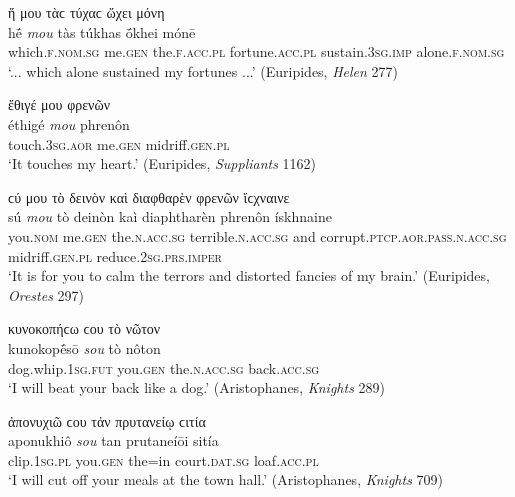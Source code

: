 \begin{exe}
\ex ἥ μου τὰϲ τύχαϲ ὤχει μόνη\\
\gll hḗ \emph{mou} tàs túkhas ṓkhei mónē\\
which.\textsc{f.nom.sg} me.\textsc{gen} the.\textsc{f.acc.pl} fortune.\textsc{acc.pl} sustain.\textsc{3sg.imp} alone.\textsc{f.nom.sg}\\
\trans `... which alone sustained my fortunes ...' (Euripides, \textit{Helen} 277)
\label{gen6}
\end{exe}

\begin{exe}
\ex ἔθιγέ μου φρενῶν\\
\gll éthigé \emph{mou} phrenôn\\
touch.\textsc{3sg.aor} me.\textsc{gen} midriff.\textsc{gen.pl}\\
\trans `It touches my heart.' (Euripides, \textit{Suppliants} 1162)
\label{gen7}
\end{exe}

\begin{exe}
\ex ϲύ μου τὸ δεινὸν καὶ διαφθαρὲν φρενῶν ἴϲχναινε\\
\gll sú \emph{mou} tò deinòn kaì diaphtharèn phrenôn ískhnaine\\
you.\textsc{nom} me.\textsc{gen} the.\textsc{n.acc.sg} terrible.\textsc{n.acc.sg} and corrupt.\textsc{ptcp.aor.pass.n.acc.sg} midriff.\textsc{gen.pl} reduce.\textsc{2sg.prs.imper}\\
\trans `It is for you to calm the terrors and distorted fancies of my brain.' (Euripides, \textit{Orestes} 297)
\label{gen8}
\end{exe}

\begin{exe}
\ex κυνοκοπήϲω ϲου τὸ νῶτον\\
\gll kunokopḗsō \emph{sou} tò nôton\\
dog.whip.\textsc{1sg.fut} you.\textsc{gen} the.\textsc{n.acc.sg} back.\textsc{acc.sg}\\
\trans `I will beat your back like a dog.' (Aristophanes, \textit{Knights} 289)
\label{gen9}
\end{exe}

\begin{exe}
\ex ἀπονυχιῶ ϲου τἀν πρυτανείῳ ϲιτία\\
\gll aponukhiô \emph{sou} tan prutaneíōi sitía\\
clip.\textsc{1sg.pl} you.\textsc{gen} the=in court.\textsc{dat.sg}
loaf.\textsc{acc.pl}\\
\trans `I will cut off your meals at the town hall.' (Aristophanes, \textit{Knights} 709)
\label{gen10}
\end{exe}

